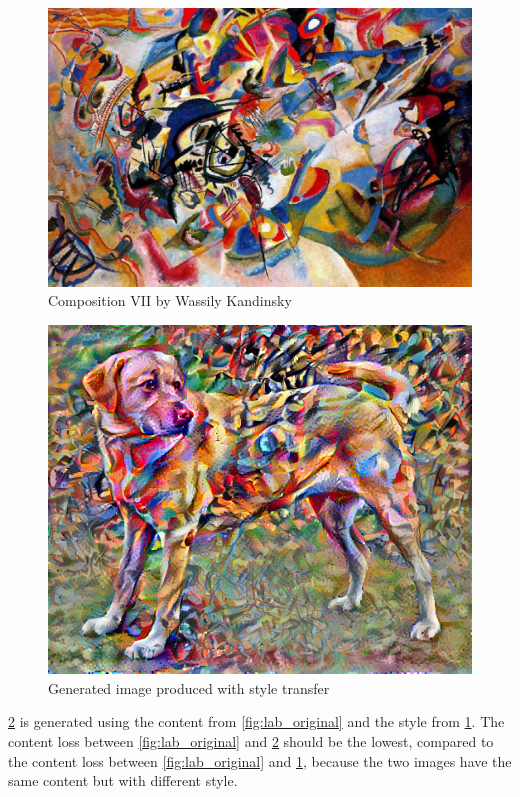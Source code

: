 \begin{figure}[H]
    \centering
    \includegraphics[width=\linewidth]{Figures/content_loss_images/lab2.jpg}
    \caption{Composition VII by Wassily Kandinsky}
    \label{fig:lab_style}
\end{figure}

\begin{figure}[H]
    \centering
    \includegraphics[width=\linewidth]{Figures/content_loss_images/lab3.jpg}
    \caption{Generated image produced with style transfer}
    \label{fig:lab_style_transfer}
\end{figure}

\cref{fig:lab_style_transfer} is generated using the content from \cref{fig:lab_original} and the style from \cref{fig:lab_style}. The content loss between \cref{fig:lab_original} and \cref{fig:lab_style_transfer} should be the lowest, compared to the content loss between \cref{fig:lab_original} and \cref{fig:lab_style}, because the two images have the same content but with different style. 
